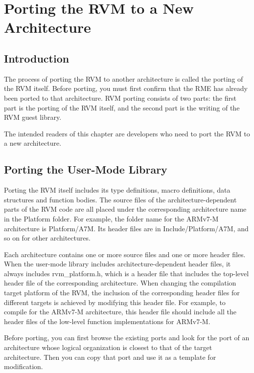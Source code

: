\chapter{Porting the RVM to a New Architecture}\label{ch:8-porting-rvm}

\section{Introduction}\label{sec:8-1}

The process of porting the RVM to another architecture is called the porting of the RVM itself. Before porting, you must first confirm that the RME has already been ported to that architecture. RVM porting consists of two parts: the first part is the porting of the RVM itself, and the second part is the writing of the RVM guest library.

The intended readers of this chapter are developers who need to port the RVM to a new architecture.

\section{Porting the User-Mode Library}\label{sec:8-2}

Porting the RVM itself includes its type definitions, macro definitions, data structures and function bodies. The source files of the architecture-dependent parts of the RVM code are all placed under the corresponding architecture name in the Platform folder. For example, the folder name for the ARMv7-M architecture is Platform/A7M. Its header files are in Include/Platform/A7M, and so on for other architectures.

Each architecture contains one or more source files and one or more header files. When the user-mode library includes architecture-dependent header files, it always includes rvm\_platform.h, which is a header file that includes the top-level header file of the corresponding architecture. When changing the compilation target platform of the RVM, the inclusion of the corresponding header files for different targets is achieved by modifying this header file. For example, to compile for the ARMv7-M architecture, this header file should include all the header files of the low-level function implementations for ARMv7-M.

Before porting, you can first browse the existing ports and look for the port of an architecture whose logical organization is closest to that of the target architecture. Then you can copy that port and use it as a template for modification.

